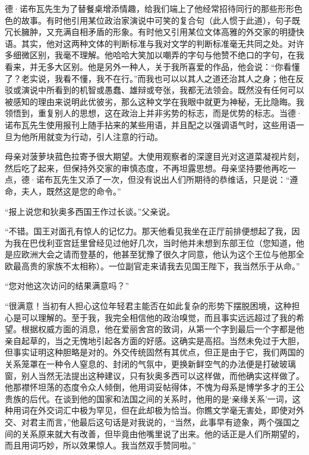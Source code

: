\par 德·诺布瓦先生为了替餐桌增添情趣，给我们端上了他经常招待同行的那些形形色色的故事。有时他引用某位政治家演说中可笑的复合句（此人惯于此道），句子既冗长臃肿，又充满自相矛盾的形象。有时他又引用某位文体高雅的外交家的明捷快语。其实，他对这两种文体的判断标准与我对文学的判断标准毫无共同之处。对许多细微区别，我毫不理解。他哈哈大笑加以嘲弄的字句与他赞不绝口的字句，在我看来，并无多大区别。他是另外一种人，关于我所喜爱的作品，他会说：“你看懂了？老实说，我看不懂，我不在行。”而我也可以以其人之道还治其人之身；他在反驳或演说中所看到的机智或愚蠢、雄辩或夸张，我都无法领会。既然没有任何可以被感知的理由来说明此优彼劣，那么这种文学在我眼中就更为神秘，无比隐晦。我领悟到，重复别人的思想，这在政治上并非劣势的标志，而是优势的标志。当德·诺布瓦先生使用报刊上随手拈来的某些用语，并且配之以强调语气时，这些用语一旦为他所用就变为行动，引人注意的行动。
\par 母亲对菠萝块菰色拉寄予很大期望。大使用观察者的深邃目光对这道菜凝视片刻，然后吃了起来，但保持外交家的审慎态度，不再坦露思想。母亲坚持要他再吃一点，德·诺布瓦先生又添了一次，但没有说出人们所期待的恭维话，只是说：“遵命，夫人，既然这是您的命令。”
\par “报上说您和狄奥多西国王作过长谈。”父亲说。
\par “不错。国王对面孔有惊人的记忆力。那天他看见我坐在正厅前排便想起了我，因为我在巴伐利亚宫廷里曾经见过他好几次，当时他并未想到东部王位（您知道，他是应欧洲大会之请而登基的，他甚至犹豫了很久才同意，他认为这个王位与他那全欧最高贵的家族不太相称）。一位副官走来请我去见国王陛下，我当然乐于从命。”
\par “您对他这次访问的结果满意吗？”
\par “很满意！当初有人担心这位年轻君主能否在如此复杂的形势下摆脱困境，这种担心是可以理解的。至于我，我完全相信他的政治嗅觉，而且事实远远超过了我的希望。根据权威方面的消息，他在爱丽舍宫的致词，从第一个字到最后一个字都是他亲自起草的，当之无愧地引起各方面的好感。这确实是高招。当然未免过于大胆，但事实证明这种胆略是对的。外交传统固然有其优点，但正是由于它，我们两国的关系笼罩在一种令人窒息的、封闭的气氛中，更换新鲜空气的办法便是打破玻璃窗，别人当然无法提出这种建议，只有狄奥多西可以这样做，而他确实这样做了。他那襟怀坦荡的态度令众人倾倒，他用词妥帖得体，不愧为母系是博学多才的王公贵族的后代。在谈到他的国家和法国之间的关系时，他用的是‘亲缘关系’一词，这种用词在外交词汇中极为罕见，但在此却极为恰当。你瞧文学毫无害处，即使对外交、对君主而言，”他最后这句话是对我说的，“当然，此事早有迹象，两个强国之间的关系原来就大有改善，但毕竟由他嘴里说了出来。他的话正是人们所期望的，而且用词巧妙，所以效果惊人。我当然双手赞同啦。”
